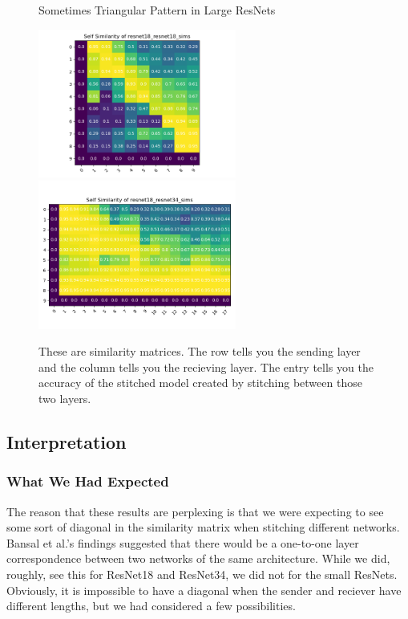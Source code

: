 \documentclass{article} %
\begin{document}
\begin{center}
   \begin{figure}[h!]
      \centering
      \caption{Sometimes Triangular Pattern in Large ResNets}
      \includegraphics[width=6.5cm]{resnet18_resnet18_sims.png}
      \includegraphics[width=6.5cm]{resnet18_resnet34_sims.png}
      \caption*{These are similarity matrices. The row tells you the sending layer and the column tells you the recieving layer.
      The entry tells you the accuracy of the stitched model created by stitching between those two layers.}
   \end{figure}
\end{center}

\subsection*{Interpretation}
\subsubsection*{What We Had Expected}
The reason that these results are perplexing is that we were expecting to see some sort of diagonal in the similarity matrix
when stitching
different networks. Bansal et al.'s findings suggested that there would be a one-to-one layer correspondence between
two networks of the same architecture. While we did, roughly, see this for ResNet18 and ResNet34, we did not for the
small ResNets. Obviously, it is impossible to have a diagonal when the sender and reciever have different lengths,
but we had considered a few possibilities.
\end{document}
